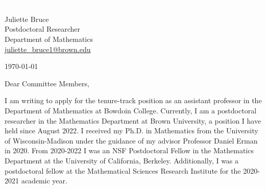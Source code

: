 \documentclass[11pt]{article}
\begin{document}
\section*{}

\noindent
\begin{minipage}{0.99\textwidth}
\begin{minipage}{0.69\textwidth}
\textcolor{white}{.}
\end{minipage}
\begin{minipage}{0.29\textwidth}
{
Juliette Bruce \\
Postdoctoral Researcher \\
Department of Mathematics \\
\href{mailto:juliette\_bruce1@brown.edu}{juliette\_bruce1@brown.edu}
}

\vspace{12pt}
\today
\end{minipage}
\end{minipage}


\vspace{12pt}
\noindent
Dear Committee Members,

I am writing to apply for the  tenure-track position as an assistant professor in the Department of Mathematics at Bowdoin College. Currently, I am a postdoctoral researcher in the Mathematics Department at Brown University, a position I have held since August 2022. I received my Ph.D. in Mathematics from the University of Wisconsin-Madison under the guidance of my advisor Professor Daniel Erman in 2020. From 2020-2022 I was an NSF Postdoctoral Fellow in the Mathematics Department at the University of California, Berkeley. Additionally, I was a postdoctoral fellow at the Mathematical Sciences Research Institute for the 2020-2021 academic year.
\end{document}
